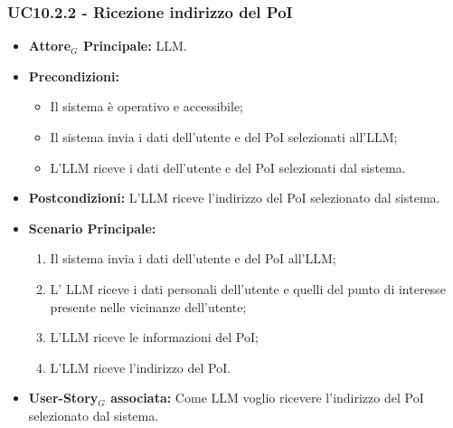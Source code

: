 \documentclass[11pt]{article}
\begin{document}
\begin{justify}
\subsubsection{\textbf{UC10.2.2 - Ricezione indirizzo del PoI}}
\begin{itemize}
    \item \textbf{Attore$_G$ Principale:} LLM.
    \item \textbf{Precondizioni:} 
        \begin{itemize}
          \item Il sistema è operativo e accessibile;
          \item Il sistema invia i dati dell'utente e del PoI selezionati all'LLM;
            \item L'LLM riceve i dati dell'utente e del PoI selezionati dal sistema.
        \end{itemize}
      \item \textbf{Postcondizioni:} L'LLM riceve l'indirizzo del PoI selezionato dal sistema.
    \item \textbf{Scenario Principale:} 
        \begin{enumerate}
          \item Il sistema invia i dati dell'utente e del PoI all'LLM;
        \item L' LLM riceve i dati personali dell'utente e quelli del punto di interesse presente nelle vicinanze dell'utente;
          \item L'LLM riceve le informazioni del PoI;
          \item L'LLM riceve l'indirizzo del PoI.
        \end{enumerate}
      \item \textbf{User-Story$_G$ associata:} Come LLM voglio ricevere l'indirizzo del PoI selezionato dal sistema.
\end{itemize}

\end{justify}
\end{document}
